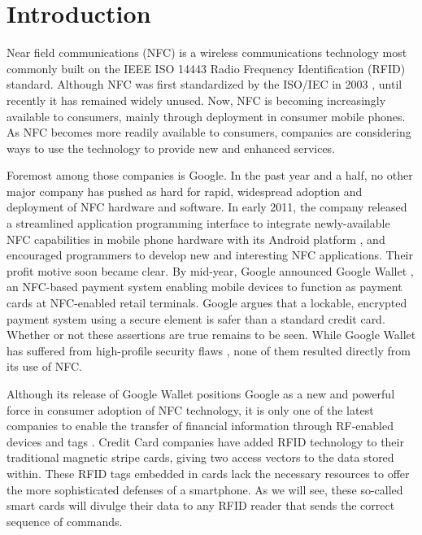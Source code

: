 \documentclass{sig-alternate}
\begin{document}


\section{Introduction}
Near field communications (NFC) is a wireless communications technology most commonly built on the IEEE ISO 14443 Radio Frequency Identification (RFID) standard.  Although NFC was first standardized by the ISO/IEC in 2003 \cite{ecma-nfc-adoption}, until recently it has remained widely unused.  Now, NFC is becoming increasingly available to consumers, mainly through deployment in consumer mobile phones.  As NFC becomes more readily available to consumers, companies are considering ways to use the technology to provide new and enhanced services.

Foremost among those companies is Google.  In the past year and a half, no other major company has pushed as hard for rapid, widespread adoption and deployment of NFC hardware and software.  In early 2011, the company released a streamlined application programming interface to integrate newly-available NFC capabilities in mobile phone hardware with its Android platform \cite{nfcworld-nfc-additions-android-2.3.3}, and encouraged programmers to develop new and interesting NFC applications.  Their profit motive soon became clear.  By mid-year, Google announced Google Wallet \cite{google-blog-1}, an NFC-based payment system enabling mobile devices to function as payment cards at NFC-enabled retail terminals.  Google argues \cite{google-wallet-security-1} that a lockable, encrypted payment system using a secure element is safer than a standard credit card.  Whether or not these assertions are true remains to be seen.  While Google Wallet has suffered from high-profile security flaws \cite{esecurityplanet-google-wallet-hacked}, none of them resulted directly from its use of NFC.

Although its release of Google Wallet positions Google as a new and powerful force in consumer adoption of NFC technology, it is only one of the latest companies to enable the transfer of financial information through RF-enabled devices and tags \cite{smartcardaliance-more-visa-paywave}.  Credit Card companies have added RFID technology to their traditional magnetic stripe cards, giving two access vectors to the data stored within.  These RFID tags embedded in cards lack the necessary resources to offer the more sophisticated defenses of a smartphone.  As we will see, these so-called smart cards will divulge their data to any RFID reader that sends the correct sequence of commands.    
\end{document}
